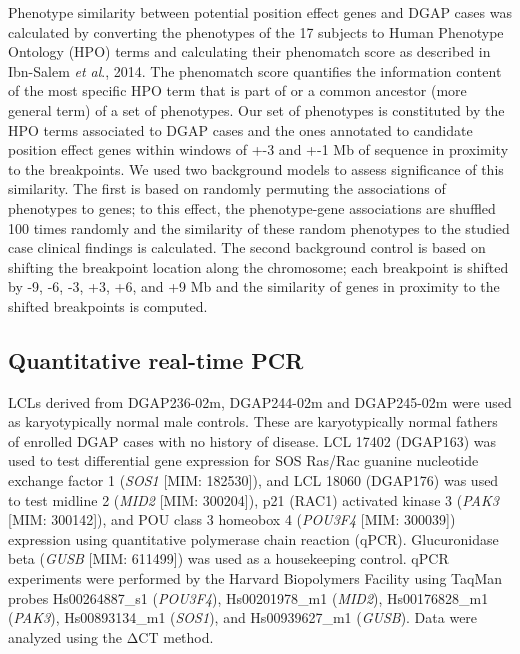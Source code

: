 \documentclass[a4paper,twoside=true,openright,parskip=full,chapterprefix=true,11pt,headings=normal,bibliography=totoc,listof=totoc,titlepage=on,captions=tableabove,draft=false]{scrreprt}
\theoremstyle{definition}
\theoremstyle{definition}
\theoremstyle{definition}
\theoremstyle{remark}
\begin{document}
Phenotype similarity between potential position effect genes and DGAP
cases was calculated by converting the phenotypes of the 17 subjects to
Human Phenotype Ontology (HPO)\citep{Kohler2014} terms and calculating
their phenomatch score as described in Ibn-Salem \emph{et al}.,
2014.\citep{Ibn-Salem2014} The phenomatch score quantiﬁes the
information content of the most speciﬁc HPO term that is part of or a
common ancestor (more general term) of a set of phenotypes. Our set of
phenotypes is constituted by the HPO terms associated to DGAP cases and
the ones annotated to candidate position effect genes within windows of
+-3 and +-1 Mb of sequence in proximity to the breakpoints. We used two
background models to assess signiﬁcance of this similarity. The ﬁrst is
based on randomly permuting the associations of phenotypes to genes; to
this effect, the phenotype-gene associations are shuffled 100 times
randomly and the similarity of these random phenotypes to the studied
case clinical findings is calculated. The second background control is
based on shifting the breakpoint location along the chromosome; each
breakpoint is shifted by -9, -6, -3, +3, +6, and +9 Mb and the
similarity of genes in proximity to the shifted breakpoints is computed.

\hypertarget{quantitative-real-time-pcr}{%
\subsection{Quantitative real-time
PCR}\label{quantitative-real-time-pcr}}

LCLs derived from DGAP236-02m, DGAP244-02m and DGAP245-02m were used as
karyotypically normal male controls. These are karyotypically normal
fathers of enrolled DGAP cases with no history of disease. LCL 17402
(DGAP163) was used to test differential gene expression for SOS Ras/Rac
guanine nucleotide exchange factor 1 (\emph{SOS1} {[}MIM: 182530{]}),
and LCL 18060 (DGAP176) was used to test midline 2 (\emph{MID2} {[}MIM:
300204{]}), p21 (RAC1) activated kinase 3 (\emph{PAK3} {[}MIM:
300142{]}), and POU class 3 homeobox 4 (\emph{POU3F4} {[}MIM: 300039{]})
expression using quantitative polymerase chain reaction (qPCR).
Glucuronidase beta (\emph{GUSB} {[}MIM: 611499{]}) was used as a
housekeeping control. qPCR experiments were performed by the Harvard
Biopolymers Facility using TaqMan probes Hs00264887\_s1 (\emph{POU3F4}),
Hs00201978\_m1 (\emph{MID2}), Hs00176828\_m1 (\emph{PAK3}),
Hs00893134\_m1 (\emph{SOS1}), and Hs00939627\_m1 (\emph{GUSB}). Data
were analyzed using the ΔCT method.
\end{document}
